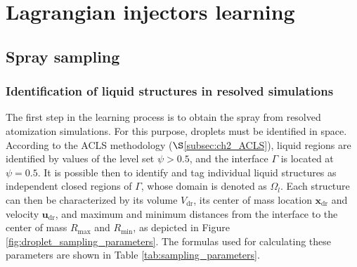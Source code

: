 %










\section{Lagrangian injectors learning}
	\label{sec:ch4_SLI_learning}


\subsection{Spray sampling}
\label{subsec:SLI_spray_sampling}

\subsubsection*{Identification of liquid structures in resolved simulations}

The first step in the learning process is to obtain the spray from resolved atomization simulations. For this purpose, droplets must be identified in space. According to the ACLS methodology ($\S$\ref{subsec:ch2_ACLS}), liquid regions are identified by values of the level set $\psi > 0.5$, and the interface $\Gamma$ is located at $\psi = 0.5$. It is possible then to identify and tag individual liquid structures as independent closed regions of $\Gamma$, whose domain is denoted as $\Omega_l$. Each structure can then be characterized by its volume $V_\mathrm{dr}$, its center of mass location $\textbf{x}_\mathrm{dr}$ and velocity $\textbf{u}_\mathrm{dr}$, and maximum and minimum distances from the interface to the center of mass $R_\mathrm{max}$ and $R_\mathrm{min}$, as depicted in Figure \ref{fig:droplet_sampling_parameters}. The formulas used for calculating these parameters are shown in Table \ref{tab:sampling_parameters}. 

